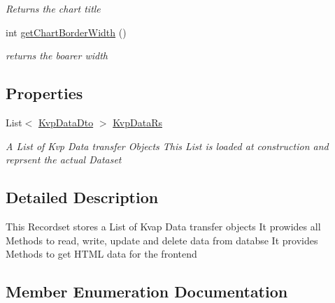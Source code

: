 \begin{DoxyCompactItemize}
\begin{DoxyCompactList}\small\item\em Returns the chart title \end{DoxyCompactList}\item 
int \hyperlink{classkpi_mvc_api_1_1_data_transfer_objects_1_1_kvp_data_dto_rs_afcb6b42bf6a7f8271efc95f671bc9e08}{get\+Chart\+Border\+Width} ()
\begin{DoxyCompactList}\small\item\em returns the boarer width \end{DoxyCompactList}\end{DoxyCompactItemize}
\subsection*{Properties}
\begin{DoxyCompactItemize}
\item 
List$<$ \hyperlink{classkpi_mvc_api_1_1_data_transfer_objects_1_1_kvp_data_dto}{Kvp\+Data\+Dto} $>$ \hyperlink{classkpi_mvc_api_1_1_data_transfer_objects_1_1_kvp_data_dto_rs_ae32122a6aba038291afde6128898487e}{Kvp\+Data\+Rs}
\begin{DoxyCompactList}\small\item\em A List of Kvp Data transfer Objects This List is loaded at construction and reprsent the actual Dataset \end{DoxyCompactList}\end{DoxyCompactItemize}


\subsection{Detailed Description}
This Recordset stores a List of Kvap Data transfer objects It prowides all Methods to read, write, update and delete data from databse It provides Methods to get H\+T\+ML data for the frontend 



\subsection{Member Enumeration Documentation}
\mbox{\label{classkpi_mvc_api_1_1_data_transfer_objects_1_1_kvp_data_dto_rs_a829c595d537885ae923de884be501246}} 

